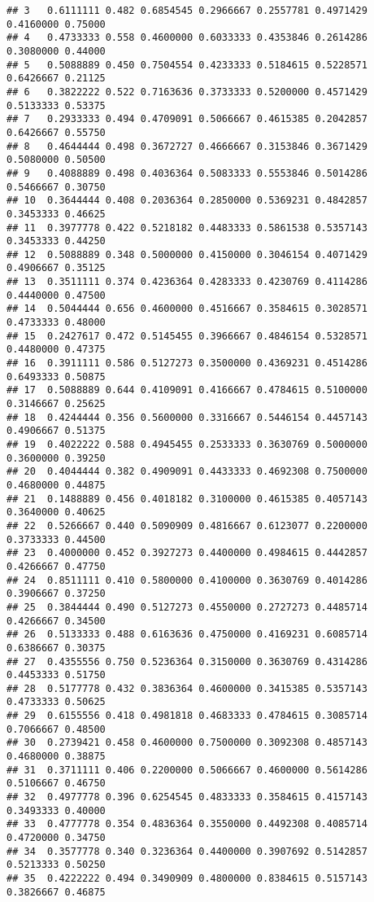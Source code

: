 \documentclass[
]{article}
\begin{document}
\begin{verbatim}
## 3   0.6111111 0.482 0.6854545 0.2966667 0.2557781 0.4971429 0.4160000 0.75000
## 4   0.4733333 0.558 0.4600000 0.6033333 0.4353846 0.2614286 0.3080000 0.44000
## 5   0.5088889 0.450 0.7504554 0.4233333 0.5184615 0.5228571 0.6426667 0.21125
## 6   0.3822222 0.522 0.7163636 0.3733333 0.5200000 0.4571429 0.5133333 0.53375
## 7   0.2933333 0.494 0.4709091 0.5066667 0.4615385 0.2042857 0.6426667 0.55750
## 8   0.4644444 0.498 0.3672727 0.4666667 0.3153846 0.3671429 0.5080000 0.50500
## 9   0.4088889 0.498 0.4036364 0.5083333 0.5553846 0.5014286 0.5466667 0.30750
## 10  0.3644444 0.408 0.2036364 0.2850000 0.5369231 0.4842857 0.3453333 0.46625
## 11  0.3977778 0.422 0.5218182 0.4483333 0.5861538 0.5357143 0.3453333 0.44250
## 12  0.5088889 0.348 0.5000000 0.4150000 0.3046154 0.4071429 0.4906667 0.35125
## 13  0.3511111 0.374 0.4236364 0.4283333 0.4230769 0.4114286 0.4440000 0.47500
## 14  0.5044444 0.656 0.4600000 0.4516667 0.3584615 0.3028571 0.4733333 0.48000
## 15  0.2427617 0.472 0.5145455 0.3966667 0.4846154 0.5328571 0.4480000 0.47375
## 16  0.3911111 0.586 0.5127273 0.3500000 0.4369231 0.4514286 0.6493333 0.50875
## 17  0.5088889 0.644 0.4109091 0.4166667 0.4784615 0.5100000 0.3146667 0.25625
## 18  0.4244444 0.356 0.5600000 0.3316667 0.5446154 0.4457143 0.4906667 0.51375
## 19  0.4022222 0.588 0.4945455 0.2533333 0.3630769 0.5000000 0.3600000 0.39250
## 20  0.4044444 0.382 0.4909091 0.4433333 0.4692308 0.7500000 0.4680000 0.44875
## 21  0.1488889 0.456 0.4018182 0.3100000 0.4615385 0.4057143 0.3640000 0.40625
## 22  0.5266667 0.440 0.5090909 0.4816667 0.6123077 0.2200000 0.3733333 0.44500
## 23  0.4000000 0.452 0.3927273 0.4400000 0.4984615 0.4442857 0.4266667 0.47750
## 24  0.8511111 0.410 0.5800000 0.4100000 0.3630769 0.4014286 0.3906667 0.37250
## 25  0.3844444 0.490 0.5127273 0.4550000 0.2727273 0.4485714 0.4266667 0.34500
## 26  0.5133333 0.488 0.6163636 0.4750000 0.4169231 0.6085714 0.6386667 0.30375
## 27  0.4355556 0.750 0.5236364 0.3150000 0.3630769 0.4314286 0.4453333 0.51750
## 28  0.5177778 0.432 0.3836364 0.4600000 0.3415385 0.5357143 0.4733333 0.50625
## 29  0.6155556 0.418 0.4981818 0.4683333 0.4784615 0.3085714 0.7066667 0.48500
## 30  0.2739421 0.458 0.4600000 0.7500000 0.3092308 0.4857143 0.4680000 0.38875
## 31  0.3711111 0.406 0.2200000 0.5066667 0.4600000 0.5614286 0.5106667 0.46750
## 32  0.4977778 0.396 0.6254545 0.4833333 0.3584615 0.4157143 0.3493333 0.40000
## 33  0.4777778 0.354 0.4836364 0.3550000 0.4492308 0.4085714 0.4720000 0.34750
## 34  0.3577778 0.340 0.3236364 0.4400000 0.3907692 0.5142857 0.5213333 0.50250
## 35  0.4222222 0.494 0.3490909 0.4800000 0.8384615 0.5157143 0.3826667 0.46875

\end{verbatim}
\end{document}

